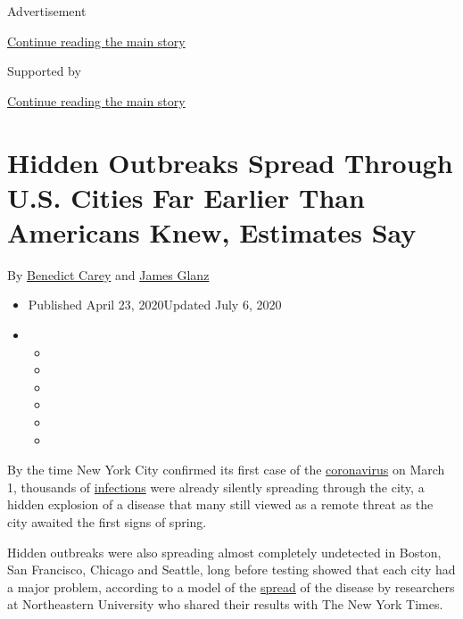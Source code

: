Advertisement

\protect\hyperlink{after-top}{Continue reading the main story}

Supported by

\protect\hyperlink{after-sponsor}{Continue reading the main story}

\hypertarget{hidden-outbreaks-spread-through-us-cities-far-earlier-than-americans-knew-estimates-say}{%
\section{Hidden Outbreaks Spread Through U.S. Cities Far Earlier Than
Americans Knew, Estimates
Say}\label{hidden-outbreaks-spread-through-us-cities-far-earlier-than-americans-knew-estimates-say}}

By \href{https://www.nytimes.com/by/benedict-carey}{Benedict Carey} and
\href{https://www.nytimes.com/by/james-glanz}{James Glanz}

\begin{itemize}
\item
  Published April 23, 2020Updated July 6, 2020
\item
  \begin{itemize}
  \item
  \item
  \item
  \item
  \item
  \item
  \end{itemize}
\end{itemize}

By the time New York City confirmed its first case of the
\href{https://www.nytimes.com/2020/07/04/health/239-experts-with-one-big-claim-the-coronavirus-is-airborne.html}{coronavirus}
on March 1, thousands of
\href{https://www.nytimes.com/2020/05/14/health/talking-coronavirus-infect.html}{infections}
were already silently spreading through the city, a hidden explosion of
a disease that many still viewed as a remote threat as the city awaited
the first signs of spring.

Hidden outbreaks were also spreading almost completely undetected in
Boston, San Francisco, Chicago and Seattle, long before testing showed
that each city had a major problem, according to a model of the
\href{https://www.nytimes.com/2020/07/04/health/239-experts-with-one-big-claim-the-coronavirus-is-airborne.html}{spread}
of the disease by researchers at Northeastern University who shared
their results with The New York Times.

